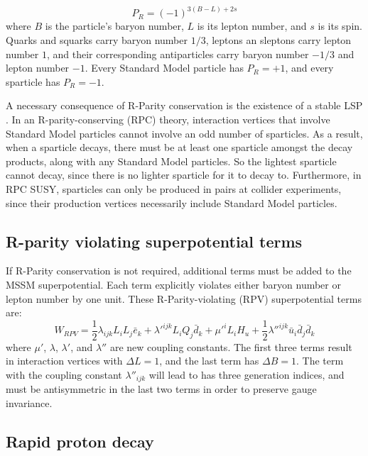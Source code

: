 \begin{equation}\label{eq:r_parity_def}
    P_R = \left(-1\right)^{3\left(B-L\right)+2s}
\end{equation}
where $B$ is the particle's baryon number, $L$ is its lepton number, and $s$ is its spin.
Quarks and squarks carry baryon number $1/3$, leptons an sleptons carry lepton number $1$, and their corresponding antiparticles carry baryon number $-1/3$ and lepton number $-1$.
Every Standard Model particle has $P_R = +1$, and every sparticle has $P_R = -1$.

A necessary consequence of R-Parity conservation is the existence of a stable LSP .
In an R-parity-conserving (RPC) theory, interaction vertices that involve Standard Model particles cannot involve an odd number of sparticles.
As a result, when a sparticle decays, there must be at least one sparticle amongst the decay products, along with any Standard Model particles.
So the lightest sparticle cannot decay, since there is no lighter sparticle for it to decay to.
Furthermore, in RPC SUSY, sparticles can only be produced in pairs at collider experiments, since their production vertices necessarily include Standard Model particles.

\subsection{R-parity violating superpotential terms}\label{subsec:rpv}

If R-Parity conservation is not required, additional terms must be added to the MSSM superpotential.
Each term explicitly violates either baryon number or lepton number by one unit.
These R-Parity-violating (RPV) superpotential terms are:
\begin{equation}\label{eq:rpv_superpotential}
    W_{RPV} = \frac{1}{2} \lambda_{ijk} L_i L_j \bar{e}_k
    + \lambda'^{ijk} L_i Q_j \bar{d}_k + \mu'^i L_i H_u
    + \frac{1}{2} \lambda''^{ijk} \bar{u}_i \bar{d}_j \bar{d}_k
\end{equation}
where $\mu'$, $\lambda$, $\lambda'$, and $\lambda''$ are new coupling constants.
The first three terms result in interaction vertices with $\Delta L = 1$, and the last term has $\Delta B = 1$.
The term with the coupling constant $\lambda''_{ijk}$ will lead to has three generation indices, and must be antisymmetric in the last two terms in order to preserve gauge invariance.

\subsection{Rapid proton decay}\label{subsec:proton_decay}

